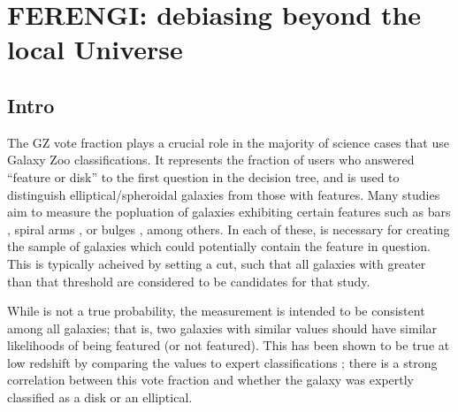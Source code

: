 



\chapter{FERENGI: debiasing beyond the local Universe}
\label{chap:ferengi}

\section{Intro}
\label{sec:ferengi_Intro}

The GZ vote fraction \ffeatures{} plays a crucial role in the majority of science cases that use Galaxy Zoo classifications. It represents the fraction of users who answered ``feature or disk'' to the first question in the decision tree, and is used to distinguish elliptical/spheroidal galaxies from those with features. Many studies aim to measure the popluation of galaxies exhibiting certain features such as bars \citep{Masters2010,Masters2012,Melvin2014,Simmons2014,Cheung2015,Kruk2017}, spiral arms \citep{Willett2015,Hart2017}, or bulges \citep{Skibba2012,Simmons2012}, among others. In each of these, \ffeatures{} is necessary for creating the sample of galaxies which could potentially contain the feature in question. This is typically acheived by setting a cut, such that all galaxies with \ffeatures{} greater than that threshold are considered to be candidates for that study.

While \ffeatures{} is not a true probability, the measurement is intended to be consistent among all galaxies; that is, two galaxies with similar \ffeatures{} values should have similar likelihoods of being featured (or not featured). This has been shown to be true at low redshift by comparing the \ffeatures values to expert classifications \citep{Willett2013}; there is a strong correlation between this vote fraction and whether the galaxy was expertly classified as a disk or an elliptical.    

